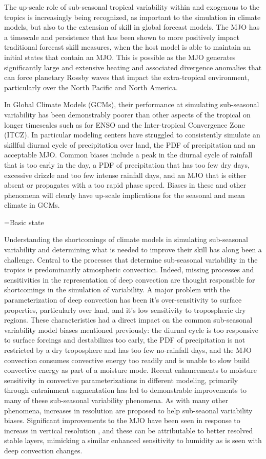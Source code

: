 \documentclass[draft,ms]{AGUTeX}
\begin{document}
\begin{article}
The up-scale role of sub-seasonal tropical variability within and exogenous to the tropics is increasingly being recognized, as important to the simulation in climate models, but also to the extension of skill in global forecast models. The MJO has a timescale and persistence that has been shown to more positively impact traditional forecast skill measures, when the host model is able to maintain an initial states that contain an MJO. This is possible as the MJO generates significantly large and extensive heating and associated divergence anomalies that can force planetary Rossby waves that impact the extra-tropical environment, particularly over the North Pacific and North America.


In Global Climate Models (GCMs), their performance at simulating sub-seasonal variability has been demonstrably poorer than other aspects of the tropical on longer timescales such as for ENSO and the Inter-tropical Convergence Zone (ITCZ). In particular modeling centers have struggled to consistently simulate an skillful diurnal cycle of precipitation over land, the PDF of precipitation and an acceptable MJO. Common biases include a peak in the diurnal cycle of rainfall that is too early in the day, a PDF of precipitation that has too few dry days, excessive drizzle and too few intense rainfall days, and an MJO that is either absent or propagates with a too rapid phase speed. Biases in these and other phenomena will clearly have up-scale implications for the seasonal and mean climate in GCMs.

=Basic state


Understanding the shortcomings of climate models in simulating sub-seasonal variability and determining what is needed to improve their skill has along been a challenge. Central to the processes that determine sub-seasonal variability in the tropics is predominantly atmospheric convection. Indeed, missing processes and sensitivities in the representation of deep convection are thought responsible for shortcomings in the simulation of variability. A major problem with the parameterization of deep convection has been it's over-sensitivity to surface properties, particularly over land, and it's low sensitivity to tropospheric dry regions. These characteristics had a direct impact on the common sub-seasonal variability model biases mentioned previously: the diurnal cycle is too responsive to surface forcings and destabilizes too early, the PDF of precipitation is not restricted by a dry troposphere and has too few no-rainfall days, and the MJO convection consumes convective energy too readily and is unable to slow build convective energy as part of a moisture mode. Recent enhancements to moisture sensitivity in convective parameterizations in different modeling, primarily through entrainment augmentation has led to demonstrable improvements to many of these sub-seasonal variability phenomena. As with many other phenomena, increases in resolution are proposed to help sub-seaonal variability biases. Significant improvements to the MJO have been seen in response to increass in vertical resolution \citep{Inness2001}, and these can be attributable to better resolved stable layers, mimicking a similar enhanced sensitivity to humidity as is seen with deep convection changes. 


\end{article}
\end{document}
